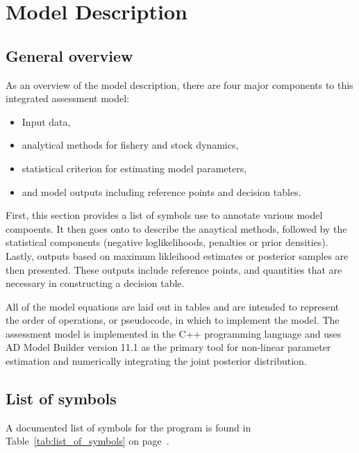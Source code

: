\section{Model Description} %
\label{sec:model_description}

\subsection{General overview} %
\label{sub:general_overview}


As an overview of the model description, there are four major components to this integrated assessment model:
\begin{itemize}
    \item Input data,
    \item analytical methods for fishery and stock dynamics,
    \item statistical criterion for estimating model parameters,
    \item and model outputs including reference points and decision tables.
\end{itemize}

First, this section provides a list of symbols use to annotate various model compoents.  It then goes onto to describe the anaytical methods, followed by the statistical components (negative loglikelihoods, penalties or prior densities). Lastly, outputs based on maximum likleihood estimates or posterior samples are then presented.  These outputs include reference points, and quantities that are necessary in constructing a decision table.

 All of the model equations are laid out in tables and are intended to represent the order of operations, or pseudocode, in which to implement the model.  The assessment model is implemented in the C++ programming language and uses AD Model Builder version 11.1 \citep{fournier2011ad} as the primary tool for non-linear parameter estimation and numerically integrating the joint posterior distribution.  

\subsection{List of symbols} %
\label{sub:list_of_symbols}
A documented list of symbols for the program is found in Table~\ref{tab:list_of_symbols} on page~\pageref{tab:list_of_symbols}.




